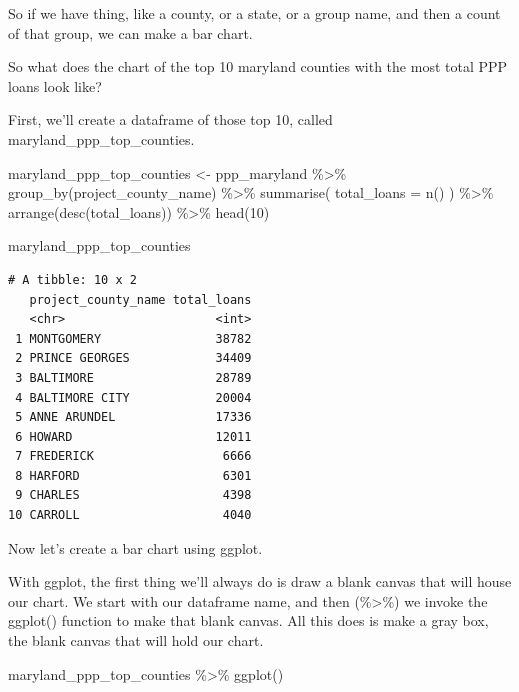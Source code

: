 \documentclass[
  letterpaper,
  DIV=11,
  numbers=noendperiod]{scrreprt}
\newenvironment{Shaded}{\begin{snugshade}}{\end{snugshade}}
\newcommand{\AttributeTok}[1]{\textcolor[rgb]{0.40,0.45,0.13}{#1}}
\newcommand{\DecValTok}[1]{\textcolor[rgb]{0.68,0.00,0.00}{#1}}
\newcommand{\FunctionTok}[1]{\textcolor[rgb]{0.28,0.35,0.67}{#1}}
\newcommand{\NormalTok}[1]{\textcolor[rgb]{0.00,0.23,0.31}{#1}}
\newcommand{\OtherTok}[1]{\textcolor[rgb]{0.00,0.23,0.31}{#1}}
\newcommand{\SpecialCharTok}[1]{\textcolor[rgb]{0.37,0.37,0.37}{#1}}
\begin{document}
So if we have thing, like a county, or a state, or a group name, and
then a count of that group, we can make a bar chart.

So what does the chart of the top 10 maryland counties with the most
total PPP loans look like?

First, we'll create a dataframe of those top 10, called
maryland\_ppp\_top\_counties.

\begin{Shaded}
\begin{Highlighting}[]
\NormalTok{maryland\_ppp\_top\_counties }\OtherTok{\textless{}{-}}\NormalTok{ ppp\_maryland }\SpecialCharTok{\%\textgreater{}\%}
  \FunctionTok{group\_by}\NormalTok{(project\_county\_name) }\SpecialCharTok{\%\textgreater{}\%}
  \FunctionTok{summarise}\NormalTok{(}
    \AttributeTok{total\_loans =} \FunctionTok{n}\NormalTok{()}
\NormalTok{  ) }\SpecialCharTok{\%\textgreater{}\%}
  \FunctionTok{arrange}\NormalTok{(}\FunctionTok{desc}\NormalTok{(total\_loans)) }\SpecialCharTok{\%\textgreater{}\%}
  \FunctionTok{head}\NormalTok{(}\DecValTok{10}\NormalTok{)}

\NormalTok{maryland\_ppp\_top\_counties}
\end{Highlighting}
\end{Shaded}

\begin{verbatim}
# A tibble: 10 x 2
   project_county_name total_loans
   <chr>                     <int>
 1 MONTGOMERY                38782
 2 PRINCE GEORGES            34409
 3 BALTIMORE                 28789
 4 BALTIMORE CITY            20004
 5 ANNE ARUNDEL              17336
 6 HOWARD                    12011
 7 FREDERICK                  6666
 8 HARFORD                    6301
 9 CHARLES                    4398
10 CARROLL                    4040
\end{verbatim}

Now let's create a bar chart using ggplot.

With ggplot, the first thing we'll always do is draw a blank canvas that
will house our chart. We start with our dataframe name, and then
(\%\textgreater\%) we invoke the ggplot() function to make that blank
canvas. All this does is make a gray box, the blank canvas that will
hold our chart.

\begin{Shaded}
\begin{Highlighting}[]
\NormalTok{maryland\_ppp\_top\_counties }\SpecialCharTok{\%\textgreater{}\%}
  \FunctionTok{ggplot}\NormalTok{()}
\end{Highlighting}
\end{Shaded}
\end{document}
